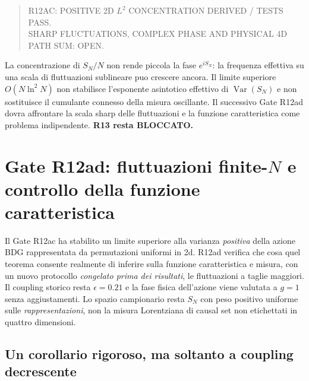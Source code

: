 \documentclass[11pt,a4paper]{article}
\newcommand{\status}[1]{\textsf{#1}}
\begin{document}
\begin{quote}
\small
\noindent\status{R12AC: POSITIVE 2D $L^2$ CONCENTRATION DERIVED / TESTS PASS.}\\
\status{SHARP FLUCTUATIONS, COMPLEX PHASE AND PHYSICAL 4D PATH SUM: OPEN.}
\end{quote}

La concentrazione di $S_N/N$ non rende piccola la fase $e^{iS_N}$: la frequenza effettiva su una scala di fluttuazioni sublineare puo crescere ancora. Il limite superiore $O(N\ln^2N)$ non stabilisce l'esponente asintotico effettivo di $\operatorname{Var}(S_N)$ e non sostituisce il cumulante connesso della misura oscillante. Il successivo Gate R12ad dovra affrontare la scala sharp delle fluttuazioni e la funzione caratteristica come problema indipendente. \textbf{R13 resta BLOCCATO.}


\section{Gate R12ad: fluttuazioni finite-$N$ e controllo della funzione caratteristica}
\label{sec:r12ad}

Il Gate R12ac ha stabilito un limite superiore alla varianza \emph{positiva} della azione BDG rappresentata da permutazioni uniformi in 2d. R12ad verifica che cosa quel teorema consente realmente di inferire sulla funzione caratteristica e misura, con un nuovo protocollo \emph{congelato prima dei risultati}, le fluttuazioni a taglie maggiori. Il coupling storico resta $\epsilon=0.21$ e la fase fisica dell'azione viene valutata a $g=1$ senza aggiustamenti. Lo spazio campionario resta $S_N$ con peso positivo uniforme sulle \emph{rappresentazioni}, non la misura Lorentziana di causal set non etichettati in quattro dimensioni.

\subsection{Un corollario rigoroso, ma soltanto a coupling decrescente}
\end{document}
